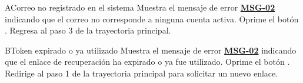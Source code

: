 \begin{UCtrayectoriaA}{A}{Correo no registrado en el sistema}
	\UCpaso Muestra el mensaje de error \hyperlink{mMSG02}{\bf MSG-02} indicando que el correo no corresponde a ninguna cuenta activa.
	\UCpaso[\UCactor] Oprime el botón .
	\UCpaso Regresa al paso 3 de la trayectoria principal.
\end{UCtrayectoriaA}

\begin{UCtrayectoriaA}{B}{Token expirado o ya utilizado}
	\UCpaso Muestra el mensaje de error \hyperlink{mMSG02}{\bf MSG-02} indicando que el enlace de recuperación ha expirado o ya fue utilizado.
	\UCpaso[\UCactor] Oprime el botón .
	\UCpaso Redirige al paso 1 de la trayectoria principal para solicitar un nuevo enlace.
\end{UCtrayectoriaA}

